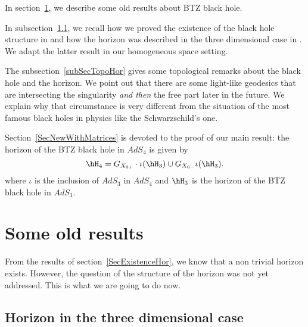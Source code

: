 	In section~\ref{SecOldResults}, we describe some old results about BTZ black hole.

	In subsection~\ref{SubSecHorInThreeDimensionOld}, we recall how we proved the existence of the black hole structure in \cite{lcTNAdS} and how the horizon was described in the three dimensional case in \cite{Keio}. We adapt the latter result in our homogeneous space setting.

	The subsection~\ref{subSecTopoHor} gives some topological remarks about the black hole and the horizon. We point out that there are some light-like geodesics that are intersecting the singularity \emph{and then} the free part later in the future. We explain why that circumstance is very different from the situation of the most famous black holes in physics like the Schwarzschild's one.

	Section~\ref{SecNewWithMatrices} is devoted to the proof of our main result: the horizon of the BTZ black hole in $AdS_4$ is given by
	\begin{equation}
		\hH_4=G_{X_{0+}}\cdot \iota(\hH_3)\cup G_{X_{0-}}\iota(\hH_3).
	\end{equation}
	where $\iota$ is the inclusion of $AdS_3$ in $AdS_4$ and $\hH_3$ is the horizon of the BTZ black hole in $AdS_3$.

	\section{Some old results}
	\label{SecOldResults}

	From the results of section~\ref{SecExistenceHor}, we know that a non trivial horizon exists. However, the question of the structure of the horizon was not yet addressed. This is what we are going to do now.

	\subsection{Horizon in the three dimensional case}
	\label{SubSecHorInThreeDimensionOld}

